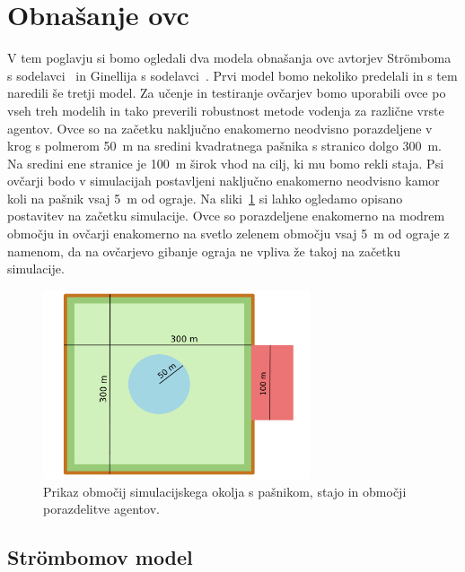 \section{Obnašanje ovc}

V tem poglavju si bomo ogledali dva modela obnašanja ovc avtorjev Str{\"o}mboma s sodelavci~\cite{Stroembom} in Ginellija s sodelavci~\cite{Ginelli}. Prvi model bomo nekoliko predelali in s tem naredili še tretji model. Za učenje in testiranje ovčarjev bomo uporabili ovce po vseh treh modelih in tako preverili robustnost metode vodenja za različne vrste agentov. Ovce so na začetku naključno enakomerno neodvisno porazdeljene v krog s polmerom 50~m na sredini kvadratnega pašnika s stranico dolgo 300~m. Na sredini ene stranice je 100~m širok vhod na cilj, ki mu bomo rekli staja. Psi ovčarji bodo v simulacijah postavljeni naključno enakomerno neodvisno kamor koli na pašnik vsaj 5~m od ograje. Na sliki~\ref{fig:zemljevid} si lahko ogledamo opisano postavitev na začetku simulacije. Ovce so porazdeljene enakomerno na modrem območju in ovčarji enakomerno na svetlo zelenem območju vsaj 5~m od ograje z namenom, da na ovčarjevo gibanje ograja ne vpliva že takoj na začetku simulacije.

\begin{figure}[ht]  %
	\centering
	\includegraphics[width=0.7\textwidth]{../poglavja/images/simulacijsko_okolje.pdf}\caption[Območja simulacijskega okolja]{Prikaz območij simulacijskega okolja s pašnikom, stajo in območji porazdelitve agentov.} %
	\label{fig:zemljevid}
\end{figure}

\subsection{Strömbomov model}\label{stroembom}


